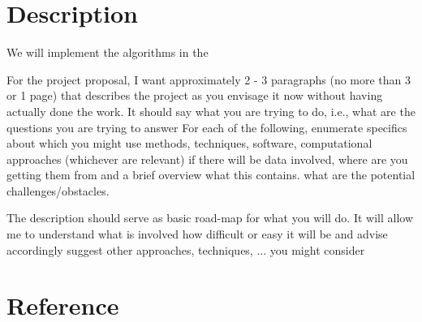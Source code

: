 \documentclass[draft]{article}
\begin{document}
\section{Description}

We will implement the algorithms in the 


For the project proposal, I want approximately 2 - 3 paragraphs (no more than 3 or 1 page) that describes the project as you envisage
it now without having actually done the work. It should say
what you are trying to do, i.e., what are the questions you are trying to answer
For each of the following, enumerate specifics about which you might use
methods,
techniques,
software,
computational approaches (whichever are relevant)  
if there will be data involved, where are you getting them from and a brief overview what this contains.
what are the potential challenges/obstacles.
 
The description should serve as basic road-map  for what you will do.
It will allow me to understand
what is involved
how difficult or easy it will be and advise accordingly
suggest other approaches, techniques, ... you might consider


\section{Reference}
\end{document}
